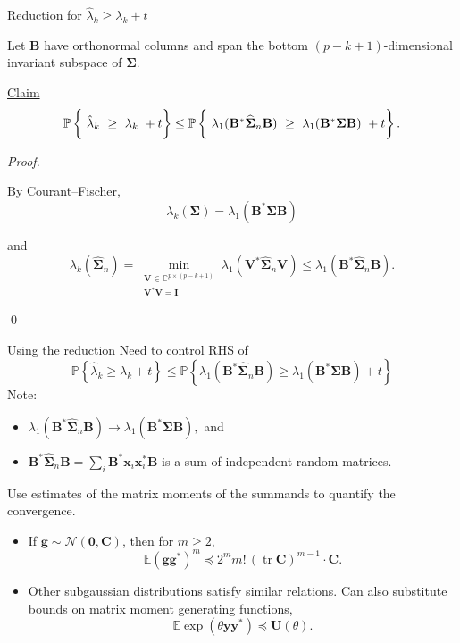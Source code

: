 \documentclass[xcolor={svgnames,pdftex,dvipsnames,table},10pt]{beamer} %
\newcommand{\mat}[1]{\ensuremath{\mathbf{#1}}}
\newcommand{\Prob}[1]{\ensuremath{\mathbb{P}\left\{#1 \right\}}}
\renewcommand{\star}{*}
\newcommand{\E}{\ensuremath{\mathbb{E}}}
\newcommand{\C}{\ensuremath{\mathbb{C}}}
\DeclareMathOperator{\tr}{tr}
\begin{document}
\begin{frame}{Reduction for $\hat{\lambda}_k \geq \lambda_k + t$}

Let $\mat{B}$ have orthonormal columns and span the bottom $(p-k+1)$-dimensional invariant subspace of $\mat{\Sigma}.$

\underline{Claim}
\[
\Prob{
\begin{tikzpicture}[baseline]
\node[anchor=base] (esteigenval) {$\hat{\lambda}_k$};
\end{tikzpicture}
\geq 
\tikz[baseline]{\node[anchor=base] (eigenval) {$\lambda_k$};} + t 
} \leq
\Prob{
\tikz[baseline]{\node[anchor=base] (pinchedesteigenval) {$\lambda_1(\mat{B}^\star \widehat{\mat{\Sigma}}_n \mat{B})$}; }
\geq  
\tikz[baseline]{\node[anchor=base] (eigenvalexpansion) {$\lambda_1(\mat{B}^\star \mat{\Sigma} \mat{B})$};} + t }.
\]

\pause
\emph{Proof.}

By Courant--Fischer,
\[
 \lambda_k(\mat{\Sigma}) = \lambda_1(\mat{B}^\star \mat{\Sigma} \mat{B})
\]

\pause
and
\[
\lambda_k(\widehat{\mat{\Sigma}}_n) = \min_{\substack{ \mat{V} \in \C^{p \times (p-k+1)} \\ \mat{V}^\star\mat{V}=\mat{I}}} \lambda_1(\mat{V}^\star \widehat{\mat{\Sigma}}_n\mat{V}) \leq \lambda_1(\mat{B}^\star \widehat{\mat{\Sigma}}_n \mat{B}).
\]

\qed
\end{frame}

\begin{frame}{Using the reduction}
Need to control RHS of 
\[
\Prob{\hat{\lambda}_k \geq \lambda_k + t }
\leq
\Prob{
\lambda_1(\mat{B}^\star \widehat{\mat{\Sigma}}_n \mat{B}) \geq  
\lambda_1(\mat{B}^\star \mat{\Sigma} \mat{B}) + t 
}
\]
\pause
Note:
\begin{itemize}
	\item 
$\lambda_1(\mat{B}^\star \hat{\mat{\Sigma}}_n \mat{B}) \rightarrow \lambda_1(\mat{B}^\star \mat{\Sigma} \mat{B}),$ and
	\item $\mat{B}^\star \hat{\mat{\Sigma}}_n \mat{B} = \sum\nolimits_i \mat{B}^\star \mat{x}_i\mat{x}_i^\star \mat{B}$ is a sum of independent random matrices.
\end{itemize}
\pause
Use estimates of the matrix moments of the summands to quantify the convergence. 
\begin{itemize}
\pause
\item If $\mat{g} \sim \mathcal{N}(\mat{0}, \mat{C})$, then for $m \geq 2,$
\[
\E(\mat{g}\mat{g}^\star)^m \preceq 2^m m!\,(\tr{\mat{C}})^{m-1} \cdot \mat{C}.
\]
\item Other subgaussian distributions satisfy similar relations. Can also substitute bounds on matrix moment generating functions, 
\[
\E \exp\left(\theta \mat{y}\mat{y}^\star \right) \preceq \mat{U}(\theta).
\]
\end{itemize}

\end{frame}
\end{document}
